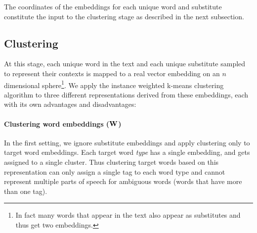 The coordinates of the embeddings for each unique word and substitute
constitute the input to the clustering stage as described in the next
subsection.


\subsection{Clustering}
\label{sec:clustering}

At this stage, each unique word in the text and each unique substitute
sampled to represent their contexts is mapped to a real vector
embedding on an $n$ dimensional sphere\footnote{In fact many words
  that appear in the text also appear as substitutes and thus get two
  embeddings.}.  We apply the instance weighted k-means clustering
algorithm to three different representations derived from these
embeddings, each with its own advantages and disadvantages:

\paragraph{Clustering word embeddings (${\bf W}$)} In the first setting,
we ignore substitute embeddings and apply clustering only to target
word embeddings.  Each target word {\em type} has a single embedding,
and gets assigned to a single cluster.  Thus clustering target words
based on this representation can only assign a single tag to each word
type and cannot represent multiple parts of speech for ambiguous
words (words that have more than one tag).  

